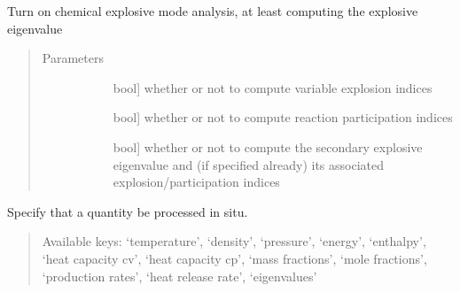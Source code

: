 \documentclass[letterpaper,10pt,english]{sphinxmanual}
\begin{document}
\begin{fulllineitems}
\begin{fulllineitems}
\label{\detokenize{spitfire.chemistry.reactors:spitfire.chemistry.reactors.HomogeneousReactor.insitu_process_cema}}
Turn on chemical explosive mode analysis, at least computing the explosive eigenvalue
\begin{quote}\begin{description}
\item[{Parameters}] \leavevmode\begin{description}
\item[{}] \leavevmode{[}bool{]}
whether or not to compute variable explosion indices

\item[{}] \leavevmode{[}bool{]}
whether or not to compute reaction participation indices

\item[{}] \leavevmode{[}bool{]}
whether or not to compute the secondary explosive eigenvalue and (if specified already) its associated explosion/participation indices

\end{description}

\end{description}\end{quote}

\end{fulllineitems}


\begin{fulllineitems}
\label{\detokenize{spitfire.chemistry.reactors:spitfire.chemistry.reactors.HomogeneousReactor.insitu_process_quantity}}
Specify that a quantity be processed in situ.
\begin{quote}

Available keys: ‘temperature’, ‘density’, ‘pressure’, ‘energy’, ‘enthalpy’, ‘heat capacity cv’, ‘heat capacity cp’,
‘mass fractions’, ‘mole fractions’, ‘production rates’, ‘heat release rate’, ‘eigenvalues’


\end{quote}
\end{fulllineitems}
\end{fulllineitems}
\end{document}
